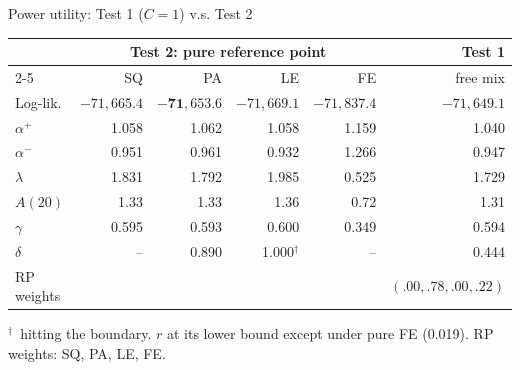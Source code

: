 \documentclass[aspectratio=169,11pt]{beamer}
\newcommand{\ap}{\alpha^{+}}
\newcommand{\am}{\alpha^{-}}
\newcommand{\bd}{\ensuremath{^{\dagger}}}
\newcommand{\tabnote}[1]{\par\vfill{\scriptsize\color{muted}#1\par}}
\begin{document}
\begin{frame}{Power utility: Test 1 ($C=1$) v.s. Test 2}
{\centering\footnotesize
\begin{tabular}{l rrrr r}
\toprule
& \multicolumn{4}{c}{Test 2: pure reference point} & Test 1\\
\cmidrule(lr){2-5}
& SQ & PA & LE & FE & free mix\\
\midrule
Log-lik. & $-71{,}665.4$ & $\mathbf{-71{,}653.6}$ & $-71{,}669.1$ & $-71{,}837.4$ & $-71{,}649.1$\\
$\ap$ & 1.058 & 1.062 & 1.058 & 1.159 & 1.040\\
$\am$ & 0.951 & 0.961 & 0.932 & 1.266 & 0.947\\
$\lambda$ & 1.831 & 1.792 & 1.985 & 0.525 & 1.729\\
$A(20)$ & 1.33 & 1.33 & 1.36 & 0.72 & 1.31\\
$\gamma$ & 0.595 & 0.593 & 0.600 & 0.349 & 0.594\\
$\delta$ & -- & 0.890 & 1.000\bd & -- & 0.444\\
RP weights & & & & & $(.00,.78,.00,.22)$\\
\bottomrule
\end{tabular}\par}

\tabnote{\bd\ hitting the boundary. $r$ at its lower bound except under pure FE (0.019). RP weights: SQ, PA, LE, FE.}
\end{frame}
\end{document}
